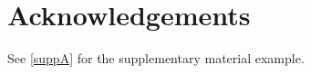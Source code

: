 \documentclass[preprint]{imsart}
\numberwithin{equation}{section}
\theoremstyle{plain}
\begin{document}







\section*{Acknowledgements}
See \ref{suppA} for the supplementary material example.








% 
\end{document}
